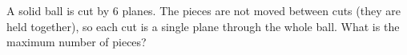 A solid ball is cut by $6$ planes. The pieces are not moved between cuts (they are held together), so each cut is a single plane through the whole ball. What is the maximum number of pieces?
